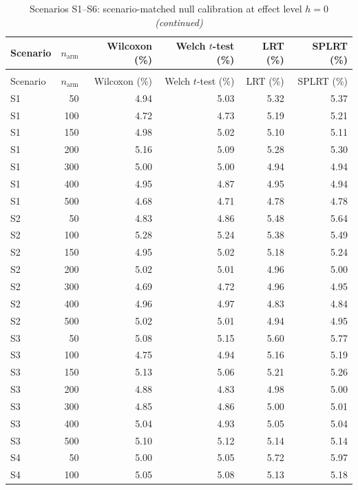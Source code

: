 \begingroup\fontsize{7}{9}\selectfont

\begin{longtable}[t]{lrrrrr}
\caption{Scenarios S1--S6: scenario-matched null calibration at effect level $h = 0$}\\
\toprule
Scenario & $n_{\mathrm{arm}}$ & Wilcoxon (\%) & Welch $t$-test (\%) & LRT (\%) & SPLRT (\%)\\
\midrule
\endfirsthead
\caption[]{Scenarios S1--S6: scenario-matched null calibration at effect level $h = 0$ \textit{(continued)}}\\
\toprule
Scenario & $n_{\mathrm{arm}}$ & Wilcoxon (\%) & Welch $t$-test (\%) & LRT (\%) & SPLRT (\%)\\
\midrule
\endhead

\endfoot
\bottomrule
\endlastfoot
S1 & 50 & 4.94 & 5.03 & 5.32 & 5.37\\
S1 & 100 & 4.72 & 4.73 & 5.19 & 5.21\\
S1 & 150 & 4.98 & 5.02 & 5.10 & 5.11\\
S1 & 200 & 5.16 & 5.09 & 5.28 & 5.30\\
S1 & 300 & 5.00 & 5.00 & 4.94 & 4.94\\
S1 & 400 & 4.95 & 4.87 & 4.95 & 4.94\\
S1 & 500 & 4.68 & 4.71 & 4.78 & 4.78\\
S2 & 50 & 4.83 & 4.86 & 5.48 & 5.64\\
S2 & 100 & 5.28 & 5.24 & 5.38 & 5.49\\
S2 & 150 & 4.95 & 5.02 & 5.18 & 5.24\\
S2 & 200 & 5.02 & 5.01 & 4.96 & 5.00\\
S2 & 300 & 4.69 & 4.72 & 4.96 & 4.95\\
S2 & 400 & 4.96 & 4.97 & 4.83 & 4.84\\
S2 & 500 & 5.02 & 5.01 & 4.94 & 4.95\\
S3 & 50 & 5.08 & 5.15 & 5.60 & 5.77\\
S3 & 100 & 4.75 & 4.94 & 5.16 & 5.19\\
S3 & 150 & 5.13 & 5.06 & 5.21 & 5.26\\
S3 & 200 & 4.88 & 4.83 & 4.98 & 5.00\\
S3 & 300 & 4.85 & 4.86 & 5.00 & 5.01\\
S3 & 400 & 5.04 & 4.93 & 5.05 & 5.04\\
S3 & 500 & 5.10 & 5.12 & 5.14 & 5.14\\
S4 & 50 & 5.00 & 5.05 & 5.72 & 5.97\\
S4 & 100 & 5.05 & 5.08 & 5.13 & 5.18\\

\end{longtable}
